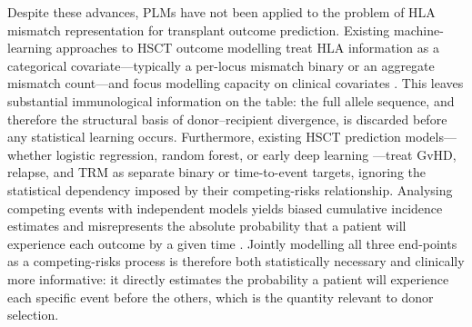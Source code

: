 \documentclass[11pt,a4paper]{article}
\begin{document}
Despite these advances, PLMs have not been applied to the problem of HLA
mismatch representation for transplant outcome prediction.  Existing
machine-learning approaches to HSCT outcome modelling treat HLA information as
a categorical covariate---typically a per-locus mismatch binary or an
aggregate mismatch count---and focus modelling capacity on clinical covariates
\citep{logan2020ml_hsct, dehn2015ml_hsct}.  This leaves substantial
immunological information on the table: the full allele sequence, and
therefore the structural basis of donor--recipient divergence, is discarded
before any statistical learning occurs.
Furthermore, existing HSCT prediction models---whether logistic regression,
random forest, or early deep learning \citep{logan2020ml_hsct, dehn2015ml_hsct}---treat
GvHD, relapse, and TRM as separate binary or time-to-event targets, ignoring
the statistical dependency imposed by their competing-risks relationship.
Analysing competing events with independent models yields biased cumulative
incidence estimates and misrepresents the absolute probability that a patient
will experience each outcome by a given time \citep{putter2007competing,
fine1999subdistribution}.  Jointly modelling all three end-points as a
competing-risks process is therefore both statistically necessary and
clinically more informative: it directly estimates the probability a patient
will experience each specific event before the others, which is the quantity
relevant to donor selection.
\end{document}
